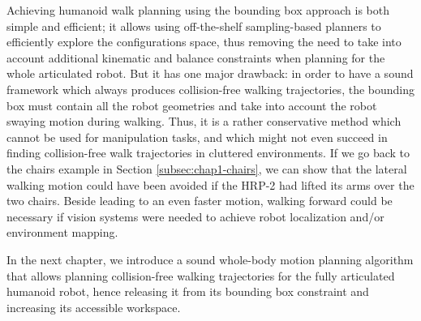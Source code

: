 Achieving humanoid walk planning using the bounding box approach is
both simple and efficient; it allows using off-the-shelf
sampling-based planners to efficiently explore the configurations
space, thus removing the need to take into account additional
kinematic and balance constraints when planning for the whole
articulated robot. But it has one major drawback: in order to have a
sound framework which always produces collision-free walking
trajectories, the bounding box must contain all the robot geometries
and take into account the robot swaying motion during walking. Thus,
it is a rather conservative method which cannot be used for
manipulation tasks, and which might not even succeed in finding
collision-free walk trajectories in cluttered environments. If we go
back to the chairs example in Section \ref{subsec:chap1-chairs}, we
can show that the lateral walking motion could have been avoided if
the HRP-2 had lifted its arms over the two chairs. Beside leading to
an even faster motion, walking forward could be necessary if vision
systems were needed to achieve robot localization and/or environment
mapping.

In the next chapter, we introduce a sound whole-body motion planning
algorithm that allows planning collision-free walking trajectories for
the fully articulated humanoid robot, hence releasing it from its
bounding box constraint and increasing its accessible workspace.
